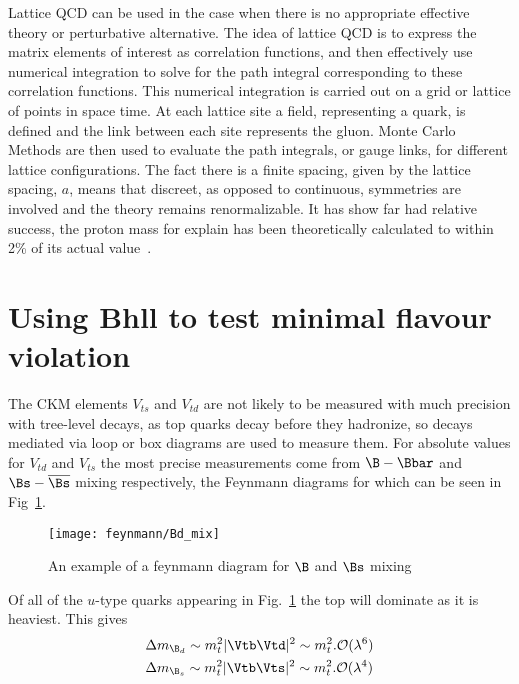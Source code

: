 Lattice QCD can be used in the case when there is no appropriate effective theory or perturbative alternative. The idea of lattice QCD is to express the matrix elements of interest as correlation functions, and then effectively use numerical integration to solve for the path integral corresponding to these correlation functions. This numerical integration is carried out on a grid or lattice of points in space time. At each lattice site a field, representing a quark, is defined and the link between each site represents the gluon. Monte Carlo Methods are then used to evaluate the path integrals, or gauge links, for different lattice configurations. The fact there is a finite spacing, given by the lattice spacing, $a$, means that discreet, as opposed to continuous, symmetries are involved and the theory remains renormalizable. It has show far had relative success, the proton mass for explain has been theoretically calculated to within 2\% of its actual value~\cite{proton}.


\section{Using B\to hll to test minimal flavour violation}
The CKM elements $V_{ts}$ and $V_{td}$ are not likely to be measured with much precision with tree-level decays, as top quarks decay before they hadronize,  so decays mediated via loop or box diagrams are used to measure them. For absolute values for $V_{td}$ and $V_{ts}$  the most precise measurements come from $\B-\Bbar$ and $\Bs-\overline{\Bs}$ mixing respectively, the Feynmann diagrams for which can be seen in Fig~\ref{fig:Bdmix}.
\begin{figure}[!h]\def\nh{0.5\textwidth}
  \centering
  \texttt{[image: feynmann/Bd\_mix]}
  \caption{An example of a feynmann diagram for $\B$ and $\Bs$ mixing}
  \label{fig:Bdmix}
\end{figure}
Of all of the $u$-type quarks appearing in Fig.~\ref{fig:Bdmix} the top will dominate as it is heaviest. This gives
\begin{equation}
  \begin{split}
    & \Delta m_{\B_{d}} \sim m_{t}^{2}|\Vtb\Vtd|^{2} \sim m_{t}^{2}.\mathcal{O}(\lambda^{6}) \\
    & \Delta m_{\B_{s}} \sim m_{t}^{2}|\Vtb\Vts|^{2} \sim m_{t}^{2}.\mathcal{O}(\lambda^{4})
  \end{split}
\end{equation}

